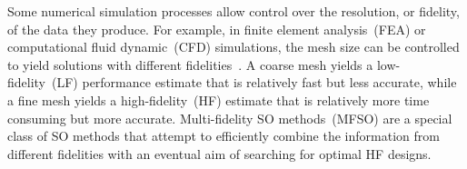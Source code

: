 \documentclass[journal]{IEEEtran}
\begin{document}


Some numerical simulation processes allow control over the resolution, or fidelity, of the data they produce. For example, in finite element analysis~(FEA) or computational fluid dynamic~(CFD) simulations, the mesh size can be controlled to yield solutions with different fidelities~\cite{branke2016efficient}. A coarse mesh yields a low-fidelity~(LF) performance estimate that is relatively fast but less accurate, while a fine mesh yields a high-fidelity~(HF) estimate that is relatively more time consuming but more accurate. Multi-fidelity SO methods~(MFSO) are a special class of SO methods that attempt to efficiently combine the information from different fidelities with an eventual aim of searching for optimal HF designs. 

% 

\end{document}

